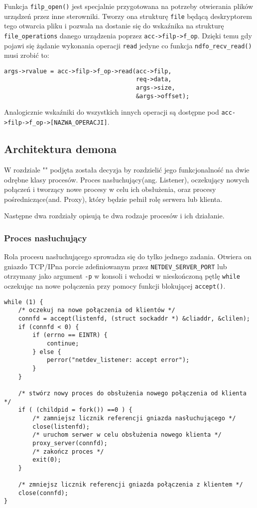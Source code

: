 \documentclass[10pt]{scrartcl}
\begin{document}
Funkcja \texttt{filp\_open()} jest specjalnie przygotowana na potrzeby otwierania plików urządzeń przez inne sterowniki. Tworzy ona strukturę \texttt{file} będącą deskryptorem tego otwarcia pliku i pozwala na dostanie się do wskaźnika na strukturę \texttt{file\_operations} danego urządzenia poprzez \texttt{acc-\textgreater{}filp-\textgreater{}f\_op}.  Dzięki temu gdy pojawi się żądanie wykonania operacji \texttt{read} jedyne co funkcja \texttt{ndfo\_recv\_read()} musi zrobić to:

\begin{verbatim}
args->rvalue = acc->filp->f_op->read(acc->filp,
                                     req->data,
                                     args->size,
                                     &args->offset);
\end{verbatim}

Analogicznie wskaźniki do wszystkich innych operacji są dostępne pod \texttt{acc-\textgreater{}filp-\textgreater{}f\_op-\textgreater{}{[}NAZWA\_OPERACJI{]}}.

\subsection{Architektura demona}

W rozdziale "" podjęta została decyzja by rozdzielić jego funkcjonalność na dwie odrębne klasy procesów. Proces nasłuchujący(ang. Listener), oczekujący nowych połączeń i tworzący nowe procesy w celu ich obsłużenia, oraz procesy pośredniczące(and. Proxy), który będzie pełnił rolę serwera lub klienta.

Następne dwa rozdziały opisują te dwa rodzaje procesów i ich działanie.

\subsubsection{Proces nasłuchujący}

Rola procesu nasłuchującego sprowadza się do tylko jednego zadania.  Otwiera on gniazdo TCP/IP\@ na porcie zdefiniowanym przez \texttt{NETDEV\_SERVER\_PORT} lub otrzymany jako argument \texttt{-p} w konsoli i wchodzi w nieskończoną pętlę \texttt{while} oczekując na nowe połączenia przy pomocy funkcji blokującej \texttt{accept()}.

\begin{verbatim}
while (1) {
    /* oczekuj na nowe połączenia od klientów */
    connfd = accept(listenfd, (struct sockaddr *) &cliaddr, &clilen);
    if (connfd < 0) {
        if (errno == EINTR) {
            continue;
        } else {
            perror("netdev_listener: accept error");
        }
    }

    /* stwórz nowy proces do obsłużenia nowego połączenia od klienta */
    if ( (childpid = fork()) ==0 ) {
        /* zamniejsz licznik referencji gniazda nasłuchującego */
        close(listenfd);
        /* uruchom serwer w celu obsłużenia nowego klienta */
        proxy_server(connfd);
        /* zakończ proces */
        exit(0);
    }

    /* zmniejsz licznik referencji gniazda połączenia z klientem */
    close(connfd);
}
\end{verbatim}
\end{document}
